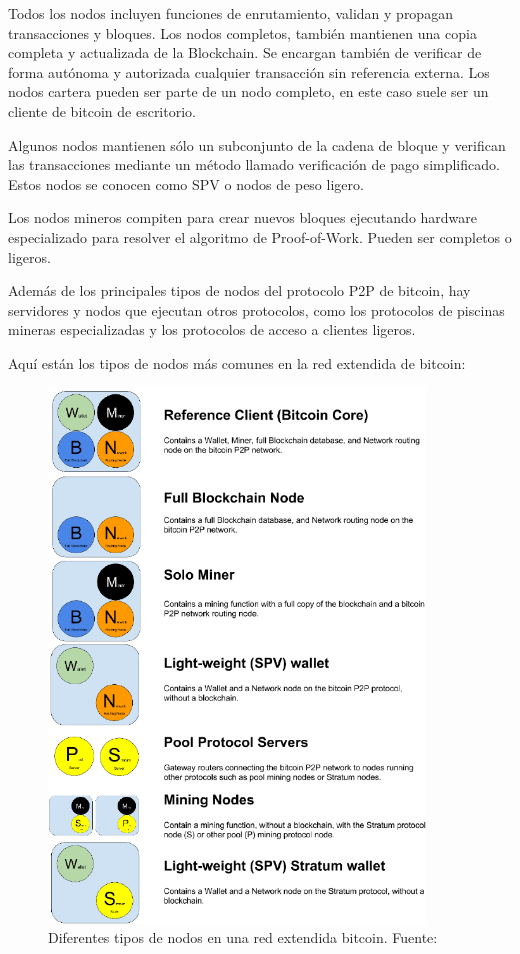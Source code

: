 \noindent Todos los nodos incluyen funciones de enrutamiento, validan y propagan transacciones y bloques. Los nodos 
completos, también mantienen una copia completa y actualizada de la Blockchain. Se encargan también de verificar de 
forma autónoma y autorizada cualquier transacción sin referencia externa. Los nodos cartera pueden ser parte de un
nodo completo, en este caso suele ser un cliente de bitcoin de escritorio.

\vspace{5mm}

\noindent Algunos nodos mantienen sólo un subconjunto de la cadena de bloque y verifican las transacciones mediante un 
método llamado verificación de pago simplificado. Estos nodos se conocen como SPV o nodos de peso ligero.

\vspace{5mm}

\noindent Los nodos mineros compiten para crear nuevos bloques ejecutando hardware especializado para resolver el 
algoritmo de Proof-of-Work. Pueden ser completos o ligeros.

\vspace{5mm}

\noindent Además de los principales tipos de nodos del protocolo P2P de bitcoin, hay servidores y nodos que ejecutan 
otros protocolos, como los protocolos de piscinas mineras especializadas y los protocolos de acceso a clientes ligeros. 

\newpage

\noindent Aquí están los tipos de nodos más comunes en la red extendida de bitcoin:

\begin{figure}[ht!]
    \centering
    \includegraphics[width=10cm]{imagenes/introduccion/diferentes_nodos_red_extendida}
    \caption{Diferentes tipos de nodos en una red extendida bitcoin. Fuente: \cite{antonopoulos2014mastering}}
\end{figure}

